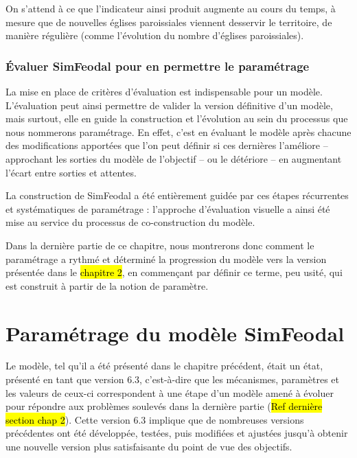 On s'attend à ce que l'indicateur ainsi produit augmente au cours du temps, à mesure que de nouvelles églises paroissiales viennent desservir le territoire, de manière régulière (comme l'évolution du nombre d'églises paroissiales).

\subsubsection{Évaluer SimFeodal pour en permettre le paramétrage}


La mise en place de critères d'évaluation est indispensable pour un modèle.
L'évaluation peut ainsi permettre de \og valider\fg{} la version définitive d'un modèle, mais surtout, elle en guide la construction et l'évolution au sein du processus que nous nommerons paramétrage.
En effet, c'est en évaluant le modèle après chacune des modifications apportées que l'on peut définir si ces dernières l'améliore -- approchant les sorties du modèle de l'objectif -- ou le détériore -- en augmentant l'écart entre sorties et attentes.

La construction de SimFeodal a été entièrement guidée par ces étapes récurrentes et systématiques de paramétrage : l'approche d'évaluation visuelle a ainsi été mise au service du processus de co-construction du modèle.

Dans la dernière partie de ce chapitre, nous montrerons donc comment le paramétrage a rythmé et déterminé la progression du modèle vers la version présentée dans le \hl{chapitre 2}, en commençant par définir ce terme, peu usité, qui est construit à partir de la notion de paramètre.

\section{Paramétrage du modèle SimFeodal}


Le modèle, tel qu'il a été présenté dans le chapitre précédent, était un \og état\fg{}, présenté en tant que \og version 6.3\fg{}, c'est-à-dire que les mécanismes, paramètres et les valeurs de ceux-ci correspondent à une étape d'un modèle amené à évoluer pour répondre aux problèmes soulevés dans la dernière partie (\hl{Ref dernière section chap 2}).
Cette version 6.3 implique que de nombreuses versions précédentes ont été développée, testées, puis modifiées et ajustées jusqu'à obtenir une nouvelle version plus satisfaisante du point de vue des objectifs.

